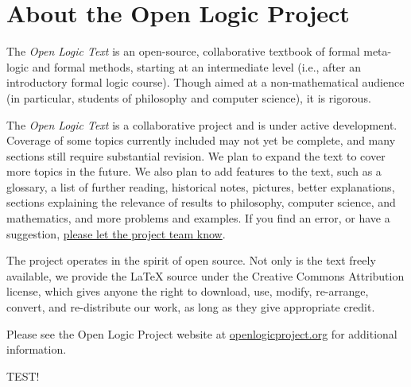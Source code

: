 \chapter*{About the Open Logic Project}

The \textit{Open Logic Text} is an open-source, collaborative textbook
of formal meta-logic and formal methods, starting at an intermediate level
(i.e., after an introductory formal logic course). Though aimed at a
non-mathematical audience (in particular, students of philosophy and
computer science), it is rigorous.

The \textit{Open Logic Text} is a collaborative project and is under
active development. Coverage of some topics currently included may
not yet be complete, and many sections still require substantial
revision. We plan to expand the text to cover more topics in
the future. We also plan to add features to the text, such as a
glossary, a list of further reading, historical notes, pictures, better
explanations, sections explaining the relevance of results to
philosophy, computer science, and mathematics, and more problems and
examples. If you find an error, or have a suggestion,
\href{https://github.com/OpenLogicProject/OpenLogic/wiki/Contributing}{please
  let the project team know}.

The project operates in the spirit of open source. Not only is the
text freely available, we provide the LaTeX source under the
Creative Commons Attribution license, which gives anyone the right to
download, use, modify, re-arrange, convert, and re-distribute our
work, as long as they give appropriate credit.

Please see the Open Logic Project website at
\href{http://openlogicproject.org/}{openlogicproject.org} for
additional information.

TEST!
